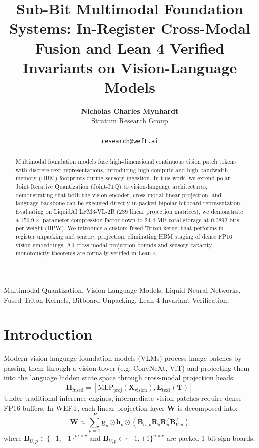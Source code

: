 \documentclass[10pt,journal,compsoc]{IEEEtran}
\title{Sub-Bit Multimodal Foundation Systems: In-Register Cross-Modal Fusion and Lean 4 Verified Invariants on Vision-Language Models}
\author{
  \textbf{Nicholas Charles Mynhardt} \\
  Stratum Research Group\\
\IEEEmembership{Google DeepMind \& WEFT Research Initiative}\\
\texttt{research@weft.ai}
}
\begin{document}
\maketitle

\begin{abstract}
Multimodal foundation models fuse high-dimensional continuous vision patch tokens with discrete text representations, introducing high compute and high-bandwidth memory (HBM) footprints during sensory ingestion. In this work, we extend polar Joint Iterative Quantization (Joint-ITQ) to vision-language architectures, demonstrating that both the vision encoder, cross-modal linear projection, and language backbone can be executed directly in packed bipolar bitboard representation. Evaluating on LiquidAI LFM3-VL-2B (239 linear projection matrices), we demonstrate a $156.9\times$ parameter compression factor down to $24.4$ MB total storage at $0.0892$ bits per weight (BPW). We introduce a custom fused Triton kernel that performs in-register unpacking and sensory projection, eliminating HBM staging of dense FP16 vision embeddings. All cross-modal projection bounds and sensory capacity monotonicity theorems are formally verified in Lean 4.
\end{abstract}

\begin{IEEEkeywords}
Multimodal Quantization, Vision-Language Models, Liquid Neural Networks, Fused Triton Kernels, Bitboard Unpacking, Lean 4 Invariant Verification.
\end{IEEEkeywords}

\section{Introduction}
Modern vision-language foundation models (VLMs) process image patches by passing them through a vision tower (e.g. ConvNeXt, ViT) and projecting them into the language hidden state space through cross-modal projection heads:
\begin{equation}
\mathbf{H}_{\text{fused}} = \left[ \text{MLP}_{\text{proj}}(\mathbf{X}_{\text{vision}}), \mathbf{E}_{\text{text}}(\mathbf{T}) \right]
\end{equation}
Under traditional inference engines, intermediate vision patches require dense FP16 buffers. In WEFT, each linear projection layer $\mathbf{W}$ is decomposed into:
\begin{equation}
\mathbf{W} \approx \sum_{p=1}^P \mathbf{g}_p \odot \mathbf{h}_p \odot \left( \mathbf{B}_{U,p} \mathbf{R}_p \mathbf{R}_p^T \mathbf{B}_{V,p}^T \right)
\end{equation}
where $\mathbf{B}_{U,p} \in \{-1, +1\}^{m \times r}$ and $\mathbf{B}_{V,p} \in \{-1, +1\}^{n \times r}$ are packed 1-bit sign boards.
\end{document}

